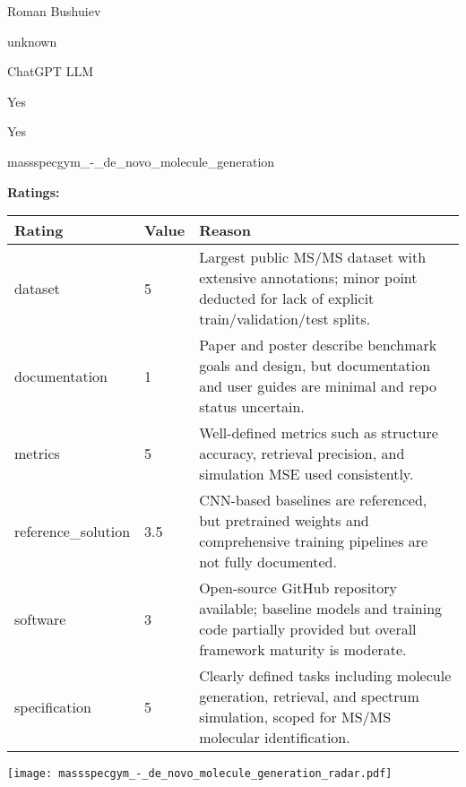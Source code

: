 {{\begin{description}[labelwidth=4cm, labelsep=1em, leftmargin=4cm, itemsep=0.1em, parsep=0em]
  \item[contact.name:] Roman Bushuiev
  \item[contact.email:] unknown
  \item[results.links.name:] ChatGPT LLM
  \item[fair.reproducible:] Yes
  \item[fair.benchmark\_ready:] Yes
  \item[id:] massspecgym\_-\_de\_novo\_molecule\_generation
  \item[Citations:] \cite{neurips2024_c6c31413}
\end{description}

{\bf Ratings:} ~ \\

\begin{tabular}{p{} p{} p{}}
\hline
Rating & Value & Reason \\
\hline
dataset & 5 & Largest public MS/MS dataset with extensive annotations; minor point deducted for
lack of explicit train/validation/test splits.
 \\
documentation & 1 & Paper and poster describe benchmark goals and design, but documentation and user
guides are minimal and repo status uncertain.
 \\
metrics & 5 & Well-defined metrics such as structure accuracy, retrieval precision, and simulation MSE
used consistently.
 \\
reference\_solution & 3.5 & CNN-based baselines are referenced, but pretrained weights and comprehensive training
pipelines are not fully documented.
 \\
software & 3 & Open-source GitHub repository available; baseline models and training code partially
provided but overall framework maturity is moderate.
 \\
specification & 5 & Clearly defined tasks including molecule generation, retrieval, and spectrum simulation,
scoped for MS/MS molecular identification.
 \\
\hline
\end{tabular}

\texttt{[image: massspecgym\_-\_de\_novo\_molecule\_generation\_radar.pdf]}
}}
\clearpage